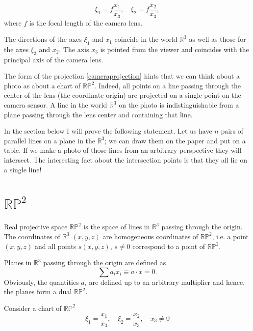 \documentclass[a4paper,10pt]{article}
\begin{document}
\begin{equation}
\xi_1 = f\frac{x_1}{x_3}, \quad \xi_2 = f\frac{x_2}{x_3},\label{cameraprojection}
\end{equation}
where $f$ is the focal length of the camera lens.

The directions of the axes $\xi_1$ and $x_1$ coincide in the world $\mathbb{R}^3$ as well as those for the axes  $\xi_2$ and $x_2$. The axis $x_3$ is pointed from the viewer and coincides with the principal axis of the camera lens. 

The form of the projection \eqref{cameraprojection} hints that we can think about a photo as about a chart of $\mathbb{RP}^2$. Indeed, all points on a line passing through the center of the lens (the coordinate origin) are projected on a single point on the camera sensor. A line in the world $\mathbb{R}^3$ on the photo is indistinguishable from a plane passing through the lens center and containing that line.  

In the section below I will prove the following statement. Let us have $n$ pairs of parallel lines on a plane in the $\mathbb{R}^3$; we can draw them on the paper and put on a table. If we make a photo of those lines from an arbitrary perspective they will intersect. The interesting fact about  the intersection points is that they all lie on a single line!

\section{$\mathbb{RP}^2$ }
 Real projective space $\mathbb{RP}^2$ is the space of lines in $\mathbb{R}^{3}$ passing through the origin. The coordinates of $\mathbb{R}^3$ $(x,y,z)$ are homogeneous coordinates of $\mathbb{RP}^2$, i.e. a point $(x,y,z)$ and all points $s(x,y,z)$, $s\neq 0$ correspond to a point of $\mathbb{RP}^2$.  

Planes in $\mathbb{R}^3$ passing through the origin are defined as 
\begin{equation}
\sum a_i x_i \equiv a\cdot x= 0.
\end{equation}
 Obviously, the quantities $a_i$ are defined up to an arbitrary multiplier and hence, the planes form a dual $\mathbb{RP}^2$. 
 
 Consider a chart of $\mathbb{RP}^2$
 \begin{equation}
 \xi_1 = \frac{x_1}{x_3}, \quad \xi_2=\frac{x_2}{x_3}, \quad x_3\neq 0\label{chart}
 \end{equation}
 
\end{document}
